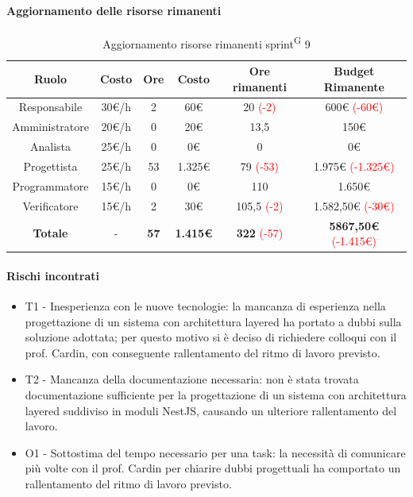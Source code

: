 \documentclass[a4paper, 11pt]{article}
\newcommand{\subsubsubsection}[1]{\paragraph{#1}}
\renewcommand{\arraystretch}{1.4} %
\begin{document}
\subsubsubsection{Aggiornamento delle risorse rimanenti}
\begin{table}[H]
	\centering
	\renewcommand{\arraystretch}{1.5}
	
	\begin{tabular}{|c|c|c|c|c|c|}
		\hline
		\textcolor{AccentColor}{\textbf{Ruolo}} &
		\textcolor{AccentColor}{\textbf{Costo}} &
		\textcolor{AccentColor}{\textbf{Ore}} &
		\textcolor{AccentColor}{\textbf{Costo}} &
		\textcolor{AccentColor}{\textbf{Ore rimanenti}} &
		\textcolor{AccentColor}{\textbf{Budget Rimanente}} \\ \hline
		
		Responsabile   & 30€/h & 2    & 60€     & 20 \textcolor{red}{(-2)}      & 600€ \textcolor{red}{(-60€)}      \\ \hline
		Amministratore & 20€/h & 0    & 20€     & 13,5     & 150€      \\ \hline
		Analista       & 25€/h & 0    & 0€      & 0                             & 0€                                \\ \hline
		Progettista    & 25€/h & 53   & 1.325€    & 79 \textcolor{red}{(-53)}    & 1.975€ \textcolor{red}{(-1.325€)}   \\ \hline
		Programmatore  & 15€/h & 0    & 0€      & 110                           & 1.650€                            \\ \hline
		Verificatore   & 15€/h & 2    & 30€     & 105,5 \textcolor{red}{(-2)}   & 1.582,50€ \textcolor{red}{(-30€)} \\ \hline
		\textbf{Totale} & - & \textbf{57} & \textbf{1.415€} & \textbf{322} \textcolor{red}{(-57)} & \textbf{5867,50€} \textcolor{red}{(-1.415€)} \\ \hline
	\end{tabular}
	\caption{Aggiornamento risorse rimanenti sprint\textsuperscript{G} 9}
\end{table}

\subsubsubsection{Rischi incontrati}
\begin{itemize}
	\item T1 - Inesperienza con le nuove tecnologie: la mancanza di esperienza nella progettazione di un sistema con architettura layered ha portato a dubbi sulla soluzione adottata; per questo motivo si è deciso di richiedere colloqui con il prof. Cardin, con conseguente rallentamento del ritmo di lavoro previsto.
	\item T2 - Mancanza della documentazione necessaria: non è stata trovata documentazione sufficiente per la progettazione di un sistema con architettura layered suddiviso in moduli NestJS, causando un ulteriore rallentamento del lavoro.
	\item O1 - Sottostima del tempo necessario per una task: la necessità di comunicare più volte con il prof. Cardin per chiarire dubbi progettuali ha comportato un rallentamento del ritmo di lavoro previsto.
\end{itemize}
\end{document}
